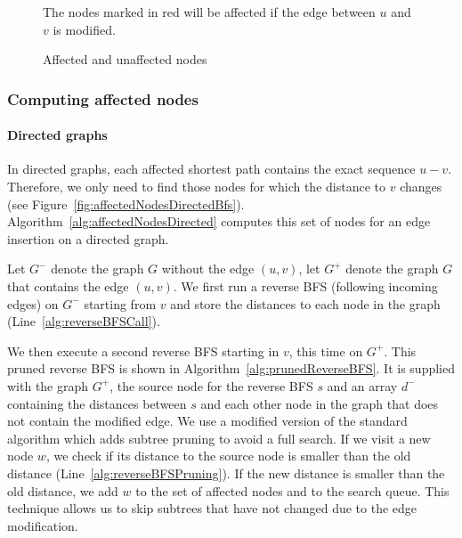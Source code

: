 \begin{figure}[h!]
\centering
{}
\caption{Affected and unaffected nodes}{The nodes marked in red will be affected if the edge between $u$ and $v$ is modified.}
\label{fig:affectedNodes}
\end{figure}



\subsubsection{Computing affected nodes}
\paragraph{Directed graphs}
In directed graphs, each affected shortest path contains the exact sequence $u - v$. Therefore, we only need to find those nodes for which the distance to $v$ changes (see Figure~\ref{fig:affectedNodesDirectedBfs}). Algorithm~\ref{alg:affectedNodesDirected} computes this set of nodes for an edge insertion on a directed graph.

Let $G^-$ denote the graph $G$ without the edge $(u, v)$, let $G^{+}$ denote the graph $G$ that contains the edge $(u, v)$. We first run a reverse BFS (following incoming edges) on $G^-$ starting from $v$ and store the distances to each node in the graph (Line~\ref{alg:reverseBFSCall}).

We then execute a second reverse BFS starting in $v$, this time on $G^{+}$. This pruned reverse BFS is shown in Algorithm~\ref{alg:prunedReverseBFS}. It is supplied with the graph $G^{+}$, the source node for the reverse BFS $s$ and an array $d^-$ containing the distances between $s$ and each other node in the graph that does not contain the modified edge. We use a modified version of the standard algorithm which adds subtree pruning to avoid a full search. If we visit a new node $w$, we check if its distance to the source node is smaller than the old distance (Line~\ref{alg:reverseBFSPruning}). If the new distance is smaller than the old distance, we add $w$ to the set of affected nodes and to the search queue. This technique allows us to skip subtrees that have not changed due to the edge modification.

